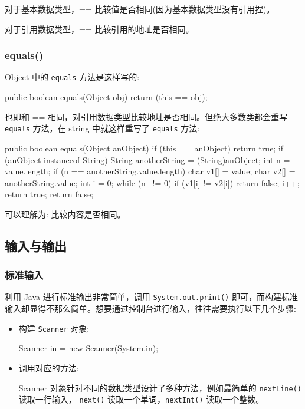 对于基本数据类型，== 比较值是否相同(因为基本数据类型没有引用捏)。

对于引用数据类型，== 比较引用的地址是否相同。

\subsubsection{equals()}

Object 中的 \texttt{equals} 方法是这样写的:
\begin{Java}
public boolean equals(Object obj) {
    return (this == obj);
}
\end{Java}

也即和 == 相同，对引用数据类型比较地址是否相同。但绝大多数类都会重写 \texttt{equals} 方法，在 string 中就这样重写了 \texttt{equals} 方法:

\begin{Java}
public boolean equals(Object anObject) {
    if (this == anObject) {
        return true;
    }
    if (anObject instanceof String) {
        String anotherString = (String)anObject;
        int n = value.length;
        if (n == anotherString.value.length) {
            char v1[] = value;
            char v2[] = anotherString.value;
            int i = 0;
            while (n-- != 0) {
                if (v1[i] != v2[i])
                    return false;
                i++;
            }
            return true;
        }
    }
    return false;
}
\end{Java}

可以理解为: 比较内容是否相同。

\subsection{输入与输出}

\subsubsection{标准输入}

利用 Java 进行标准输出非常简单，调用 \texttt{System.out.print()} 即可，而构建标准输入却显得不那么简单。想要通过控制台进行输入，往往需要执行以下几个步骤:

\begin{itemize}
    \item 构建 \texttt{Scanner} 对象:
\begin{Java}
Scanner in = new Scanner(System.in);
\end{Java}

    \item 调用对应的方法:
    
    Scanner 对象针对不同的数据类型设计了多种方法，例如最简单的 \texttt{nextLine()} 读取一行输入， \texttt{next()} 读取一个单词，\texttt{nextInt()} 读取一个整数。
\end{itemize}

